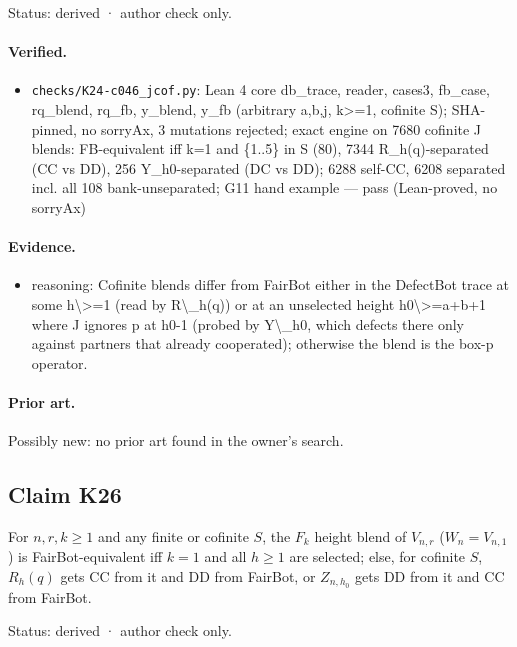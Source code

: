 \documentclass{article}
\begin{document}
Status: derived · author check only.

\paragraph{Verified.}
\begin{itemize}
\item \texttt{checks/K24-c046\_jcof.py}: Lean 4 core db\_trace, reader, cases3, fb\_case, rq\_blend, rq\_fb, y\_blend, y\_fb (arbitrary a,b,j, k\textgreater{}=1, cofinite S); SHA-pinned, no sorryAx, 3 mutations rejected; exact engine on 7680 cofinite J blends: FB-equivalent iff k=1 and \{1..5\} in S (80), 7344 R\_h(q)-separated (CC vs DD), 256 Y\_h0-separated (DC vs DD); 6288 self-CC, 6208 separated incl. all 108 bank-unseparated; G11 hand example --- pass (Lean-proved, no sorryAx)
\end{itemize}

\paragraph{Evidence.}
\begin{itemize}
\item reasoning: Cofinite blends differ from FairBot either in the DefectBot trace at some h\textbackslash{}\textgreater{}=1 (read by R\textbackslash{}\_h(q)) or at an unselected height h0\textbackslash{}\textgreater{}=a+b+1 where J ignores p at h0-1 (probed by Y\textbackslash{}\_h0, which defects there only against partners that already cooperated); otherwise the blend is the box-p operator.
\end{itemize}

\paragraph{Prior art.} Possibly new: no prior art found in the owner's search.

\subsection*{Claim K26}

For $n,r,k\ge1$ and any finite or cofinite $S$, the $F_k$ height blend of $V_{n,r}$ ($W_n=V_{n,1}$) is FairBot-equivalent iff $k=1$ and all $h\ge1$ are selected; else, for cofinite $S$, $R_h(q)$ gets CC from it and DD from FairBot, or $Z_{n,h_0}$ gets DD from it and CC from FairBot.

Status: derived · author check only.
\end{document}
